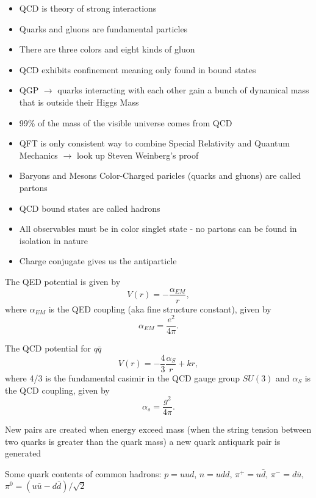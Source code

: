 \documentclass{article}
\begin{document}
\begin{itemize}
\setlength\itemsep{0em}
\item QCD is theory of strong interactions
\item Quarks and gluons are fundamental particles
\item There are three colors and eight kinds of gluon
\item QCD exhibits confinement meaning only found in bound states
\item QGP $\rightarrow$ quarks interacting with each other gain a bunch of dynamical mass that is outside their Higgs Mass
\item 99\% of the mass of the visible universe comes from QCD
\item QFT is only consistent way to combine Special Relativity and Quantum Mechanics $\rightarrow$ look up Steven Weinberg's proof
\item Baryons and Mesons Color-Charged paricles (quarks and gluons) are called partons
\item QCD bound states are called hadrons
\item All observables must be in color singlet state - no partons can be found in isolation in nature
\item Charge conjugate gives us the antiparticle
\end{itemize}

\newpage

\noindent The QED potential is given by
\begin{equation*}
V(r) = -\frac{\alpha_{EM}}{r},
\end{equation*}
where $\alpha_{EM}$ is the QED coupling (aka fine structure constant), given by
\begin{equation*}
\alpha_{EM} = \frac{e^2}{4\pi}.
\end{equation*}


\noindent The QCD potential for $q\bar{q}$
\begin{equation*}
V(r) = -\frac{4}{3}\frac{\alpha_S}{r} + kr,
\end{equation*}
where 4/3 is the fundamental casimir in the QCD gauge group $SU(3)$
and $\alpha_S$ is the QCD coupling, given by
\begin{equation*}
\alpha_s = \frac{g^2}{4\pi}.
\end{equation*}


\noindent New pairs are created when energy exceed mass (when the string tension between two quarks is greater than the quark mass)
a new quark antiquark pair is generated

\noindent Some quark contents of common hadrons:
$p = uud$, $n = udd$, $\pi^+ = u\bar{d}$, $\pi^- = d\bar{u}$, $\pi^0 = (u\bar{u} - d\bar{d})/\sqrt{2}$
\end{document}
